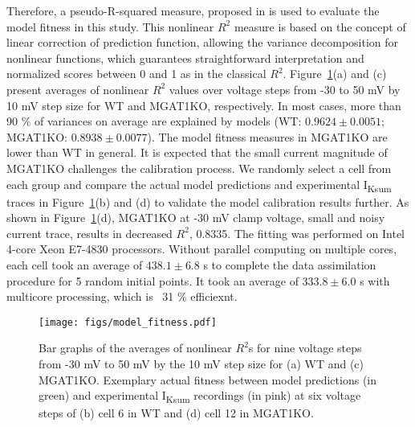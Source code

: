 \documentclass[11pt]{article}
\begin{document}
Therefore, a pseudo-R-squared measure, proposed in \citep{li2019prediction} is used to evaluate the model fitness in this study. This nonlinear $R^{2}$ measure is based on the concept of linear correction of prediction function, allowing the variance decomposition for nonlinear functions, which guarantees straightforward interpretation and normalized scores between 0 and 1 as in the classical $R^{2}$. Figure~\ref{fig:model_fitness}(a) and (c) present averages of nonlinear $R^{2}$ values over voltage steps from -30 to 50 mV by 10 mV step size for WT and MGAT1KO, respectively. In most cases, more than 90 \% of variances on average are explained by models (WT: $0.9624 \pm 0.0051$; MGAT1KO: $0.8938 \pm 0.0077$). The model fitness measures in MGAT1KO are lower than WT in general. It is expected that the small current magnitude of MGAT1KO challenges the calibration process. We randomly select a cell from each group and compare the actual model predictions and experimental I\textsubscript{Ksum} traces in Figure~\ref{fig:model_fitness}(b) and (d) to validate the model calibration results further. As shown in Figure~\ref{fig:model_fitness}(d), MGAT1KO at -30 mV clamp voltage, small and noisy current trace, results in decreased $R^{2}$, 0.8335. The fitting was performed on Intel 4-core Xeon E7-4830 processors. Without parallel computing on multiple cores, each cell took an average of $438.1 \pm 6.8$ s to complete the data assimilation procedure for 5 random initial points. It took an average of $333.8 \pm 6.0$ s with multicore processing, which is ~31 \% efficiexnt.
\begin{figure}[!ht]
    \centering
    \texttt{[image: figs/model\_fitness.pdf]}
    \caption{Bar graphs of the averages of nonlinear $R^{2}$s for nine voltage steps from -30 mV to 50 mV by the 10 mV step size for (a) WT and (c) MGAT1KO. Exemplary actual fitness between model predictions (in green) and experimental I\textsubscript{Ksum} recordings (in pink) at six voltage steps of (b) cell 6 in WT and (d) cell 12 in MGAT1KO.}
    \label{fig:model_fitness}
\end{figure}
\end{document}
